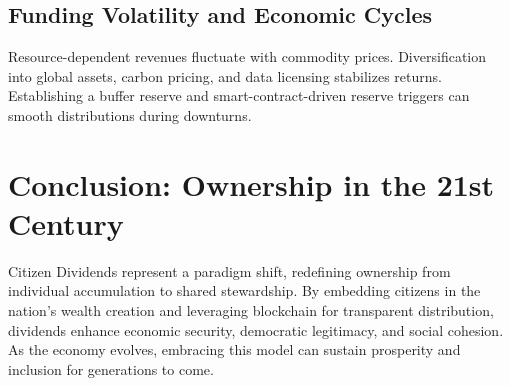 \documentclass[11pt]{article}
\begin{document}
\subsection{Funding Volatility and Economic Cycles}
Resource-dependent revenues fluctuate with commodity prices. Diversification into global assets, carbon pricing, and data licensing stabilizes returns. Establishing a buffer reserve and smart-contract-driven reserve triggers can smooth distributions during downturns.

\section{Conclusion: Ownership in the 21st Century}
Citizen Dividends represent a paradigm shift, redefining ownership from individual accumulation to shared stewardship. By embedding citizens in the nation’s wealth creation and leveraging blockchain for transparent distribution, dividends enhance economic security, democratic legitimacy, and social cohesion. As the economy evolves, embracing this model can sustain prosperity and inclusion for generations to come.



\end{document}
